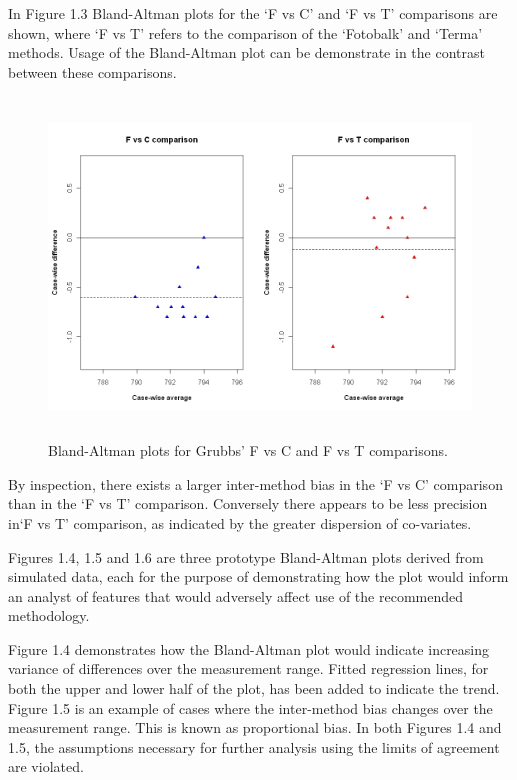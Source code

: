 \documentclass[Main.tex]{subfiles}
\begin{document}
	
	
	In Figure 1.3 Bland-Altman plots for the `F vs C' and `F vs T'
	comparisons are shown, where `F vs T' refers to the comparison of
	the `Fotobalk' and `Terma' methods. Usage of the Bland-Altman plot
	can be demonstrate in the contrast between these comparisons.
	
	\begin{figure}[h!]
		\begin{center}
			\includegraphics[height=90mm]{images/GrubbsDataTwoBAplots.jpeg}
			\caption{Bland-Altman plots for Grubbs' F vs C and F vs T comparisons.}\label{GrubbsDataTwoBAplots}
		\end{center}
	\end{figure}
	
	By inspection, there exists a larger inter-method bias in the `F
	vs C' comparison than in the `F vs T' comparison. Conversely there
	appears to be less precision in`F vs T' comparison, as indicated
	by the greater dispersion of co-variates.
	
	Figures 1.4, 1.5 and 1.6 are three prototype Bland-Altman plots
	derived from simulated data, each for the purpose of demonstrating
	how the plot would inform an analyst of features that would
	adversely affect use of the recommended methodology.
	
	Figure 1.4 demonstrates how the Bland-Altman plot would indicate
	increasing variance of differences over the measurement range.
	Fitted regression lines, for both the upper and lower half of the
	plot, has been added to indicate the trend. Figure 1.5 is an
	example of cases where the inter-method bias changes over the
	measurement range. This is known as proportional bias. In both
	Figures 1.4 and 1.5, the assumptions necessary for further
	analysis using the limits of agreement are violated.
	
\end{document}
